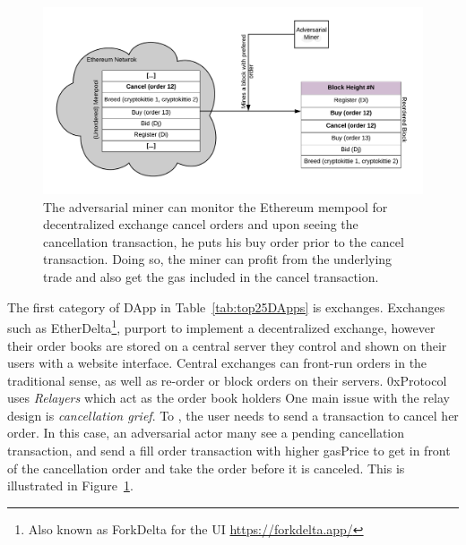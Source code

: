 


\begin{figure}[t]
\centering
\includegraphics[width=0.7\linewidth]{figures/Miner_reorder_frontrun.png}
\caption{\scriptsize The adversarial miner can monitor the Ethereum mempool for decentralized exchange cancel orders and upon seeing the cancellation transaction, he puts his buy order prior to the cancel transaction. Doing so, the miner can profit from the underlying trade and also get the gas included in the cancel transaction. \label{fig:MinerFrontrunning}} 
\end{figure}

The first category of DApp in Table~\ref{tab:top25DApps} is exchanges. Exchanges such as EtherDelta\footnote{Also known as ForkDelta for the UI \url{https://forkdelta.app/}}, purport to implement a decentralized exchange, however their order books are stored on a central server they control and shown on their users with a website interface. Central exchanges can front-run orders in the traditional sense, as well as re-order or block orders on their servers. 0xProtocol~\cite{warren20170x} uses \textit{Relayers} which act as the order book holders  One main issue with the relay design is \textit{cancellation grief}. To , the user needs to send a transaction to cancel her order. In this case, an adversarial actor many see a pending  cancellation transaction, and send  a fill order transaction with higher gasPrice to get in front of the cancellation order and take the order before it is canceled. This is illustrated in Figure~\ref{fig:MinerFrontrunning}.

